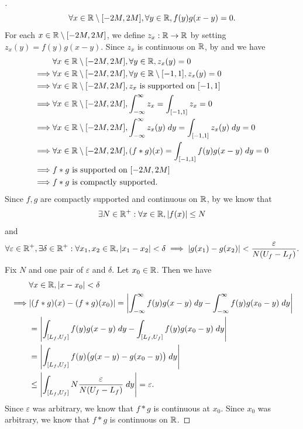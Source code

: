 \begin{proof}[]
  \[
    \forall x \in \mathbb{R} \setminus [-2M, 2M], \forall y \in \mathbb{R}, f(y) g(x - y) = 0.
  \]
  For each \(x \in \mathbb{R} \setminus [-2M, 2M]\), we define \(z_x : \mathbb{R} \to \mathbb{R}\) by setting \(z_x(y) = f(y) g(x - y)\).
  Since \(z_x\) is continuous on \(\mathbb{R}\), by  and  we have
  \begin{align*}
             & \forall x \in \mathbb{R} \setminus [-2M, 2M], \forall y \in \mathbb{R}, z_x(y) = 0                                         \\
    \implies & \forall x \in \mathbb{R} \setminus [-2M, 2M], \forall y \in \mathbb{R} \setminus [-1, 1], z_x(y) = 0                       \\
    \implies & \forall x \in \mathbb{R} \setminus [-2M, 2M], z_x \text{ is supported on } [-1, 1]                                 \\
    \implies & \forall x \in \mathbb{R} \setminus [-2M, 2M], \int_{-\infty}^\infty z_x = \int_{[-1, 1]} z_x = 0                   \\
    \implies & \forall x \in \mathbb{R} \setminus [-2M, 2M], \int_{-\infty}^\infty z_x(y) \; dy = \int_{[-1, 1]} z_x(y) \; dy = 0 \\
    \implies & \forall x \in \mathbb{R} \setminus [-2M, 2M], (f * g)(x) = \int_{[-1, 1]} f(y) g(x - y) \; dy = 0                  \\
    \implies & f * g \text{ is supported on } [-2M, 2M]                                                                   \\
    \implies & f * g \text{ is compactly supported}.
  \end{align*}
  Since \(f, g\) are compactly supported and continuous on \(\mathbb{R}\), by  we know that
  \[
    \exists N \in \mathbb{R}^+ : \forall x \in \mathbb{R}, \left\lvert f(x)\right\rvert \leq N
  \]
  and
  \[
    \forall \varepsilon \in \mathbb{R}^+, \exists \delta \in \mathbb{R}^+ : \forall x_1, x_2 \in \mathbb{R}, \left\lvert x_1 - x_2\right\rvert < \delta \implies \left\lvert g(x_1) - g(x_2)\right\rvert < \dfrac{\varepsilon}{N (U_f - L_f)}.
  \]
  Fix \(N\) and one pair of \(\varepsilon\) and \(\delta\).
  Let \(x_0 \in \mathbb{R}\).
  Then we have
  \begin{align*}
             & \forall x \in \R, \abs{x - x_0} < \delta                                                                                        \\
    \implies & \abs{(f * g)(x) - (f * g)(x_0)} = \abs{\int_{-\infty}^\infty f(y) g(x - y) \; dy - \int_{-\infty}^\infty f(y) g(x_0 - y) \; dy} \\
             & = \abs{\int_{[L_f, U_f]} f(y) g(x - y) \; dy - \int_{[L_f, U_f]} f(y) g(x_0 - y) \; dy}                                         \\
             & = \abs{\int_{[L_f, U_f]} f(y) \big(g(x - y) - g(x_0 - y)\big) \; dy}                                                            \\
             & \leq \abs{\int_{[L_f, U_f]} N \dfrac{\varepsilon}{N (U_f - L_f)} \; dy} = \varepsilon.
  \end{align*}
  Since \(\varepsilon\) was arbitrary, we know that \(f * g\) is continuous at \(x_0\).
  Since \(x_0\) was arbitrary, we know that \(f * g\) is continuous on \(\mathbb{R}\).
\end{proof}

